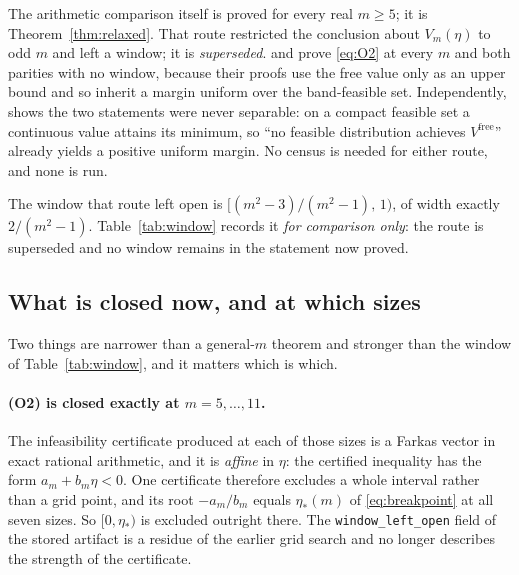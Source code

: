 The arithmetic comparison itself is proved for every real $m\ge5$; it is
Theorem~\ref{thm:relaxed}. That route restricted the conclusion about $V_{m}(\eta)$ to
odd $m$ and left a window; it is \emph{superseded}.  and
 prove \eqref{eq:O2} at every $m$ and both parities with no
window, because their proofs use the free value only as an upper bound and so inherit a
margin uniform over the band-feasible set. Independently,
 shows the two statements were never separable: on a
compact feasible set a continuous value attains its minimum, so ``no feasible distribution
achieves $V^{\mathrm{free}}$'' already yields a positive uniform margin. No census is
needed for either route, and none is run.


The window that route left open is $[(m^{2}-3)/(m^{2}-1),\,1)$, of width exactly
$2/(m^{2}-1)$. Table~\ref{tab:window} records it \emph{for comparison only}: the route is
superseded and no window remains in the statement now proved.

\subsection{What is closed now, and at which sizes}
\label{sec:closed}

Two things are narrower than a general-$m$ theorem and stronger than the window of
Table~\ref{tab:window}, and it matters which is which.

\paragraph{(O2) is closed exactly at $m=5,\dots,11$.}
The infeasibility certificate produced at each of those sizes is a Farkas vector in exact
rational arithmetic, and it is \emph{affine} in $\eta$: the certified inequality has the
form $a_{m}+b_{m}\eta<0$. One certificate therefore excludes a whole interval rather than a
grid point, and its root $-a_{m}/b_{m}$ equals $\eta_{*}(m)$ of \eqref{eq:breakpoint} at all
seven sizes. So $[0,\eta_{*})$ is excluded outright there. The
\texttt{window\_left\_open} field of the stored artifact is a residue of the earlier grid
search and no longer describes the strength of the certificate. \CERT{}

